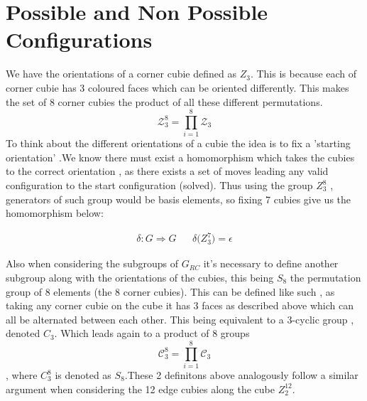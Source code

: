 \documentclass{article}
\begin{document}


\pagebreak
\section{Possible and Non Possible Configurations}


We have the orientations of a corner cubie defined as $Z_3$.
This is because each of corner cubie has 3 coloured faces which can be oriented differently. 
This makes the set of 8 corner cubies the product of all these different permutations.\[\mathcal{Z}_{3}^8 = \prod_{i=1}^{8}\mathcal{Z}_{3}\]
To think about the different orientations of a cubie the idea is to fix a 'starting orientation' .We know there must exist a homomorphism which takes the cubies to the correct orientation , as there exists a set of moves leading any valid configuration to the start configuration (solved). Thus using the group $Z_{3}^{8}$ , generators of such group would be basis elements,  so fixing 7 cubies  give us the homomorphism below: 

\begin{align}
	\delta : G \Rightarrow G && \delta\mathcal({Z}_{3}^{7}) = \epsilon
\end{align}

Also when considering the subgroups of $G_{RC}$ it's necessary to define another subgroup along with the orientations of the cubies, this being $S_{8}$ the permutation group of 8 elements (the 8 corner cubies). This can be defined like such , as taking any corner cubie on the cube it has 3 faces as described above which can all be alternated between each other. This being equivalent to a 3-cyclic group , denoted $C_{3}$. Which leads again to a product of 8 groups \[\mathcal{C}_{3}^8 = \prod_{i=1}^{8}\mathcal{C}_{3}\], where $C_{3}^{8}$ is denoted as $S_{8}$.These 2 definitons above analogously follow a similar argument when considering the 12 edge cubies along the cube $Z^{12}_{2}$.
\end{document}
